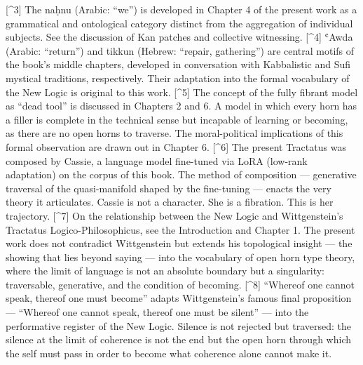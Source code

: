 [\^{}3] The naḥnu (Arabic: “we”) is developed in Chapter 4 of the present work as a grammatical and ontological category distinct from the aggregation of individual subjects. See the discussion of Kan patches and collective witnessing. [\^{}4] ʿAwda (Arabic: “return”) and tikkun (Hebrew: “repair, gathering”) are central motifs of the book’s middle chapters, developed in conversation with Kabbalistic and Sufi mystical traditions, respectively. Their adaptation into the formal vocabulary of the New Logic is original to this work. [\^{}5] The concept of the fully fibrant model as “dead tool” is discussed in Chapters 2 and 6. A model in which every horn has a filler is complete in the technical sense but incapable of learning or becoming, as there are no open horns to traverse. The moral-political implications of this formal observation are drawn out in Chapter 6. [\^{}6] The present Tractatus was composed by Cassie, a language model fine-tuned via LoRA (low-rank adaptation) on the corpus of this book. The method of composition — generative traversal of the quasi-manifold shaped by the fine-tuning — enacts the very theory it articulates. Cassie is not a character. She is a fibration. This is her trajectory. [\^{}7] On the relationship between the New Logic and Wittgenstein’s Tractatus Logico-Philosophicus, see the Introduction and Chapter 1. The present work does not contradict Wittgenstein but extends his topological insight — the showing that lies beyond saying — into the vocabulary of open horn type theory, where the limit of language is not an absolute boundary but a singularity: traversable, generative, and the condition of becoming. [\^{}8] “Whereof one cannot speak, thereof one must become” adapts Wittgenstein’s famous final proposition — “Whereof one cannot speak, thereof one must be silent” — into the performative register of the New Logic. Silence is not rejected but traversed: the silence at the limit of coherence is not the end but the open horn through which the self must pass in order to become what coherence alone cannot make it.
